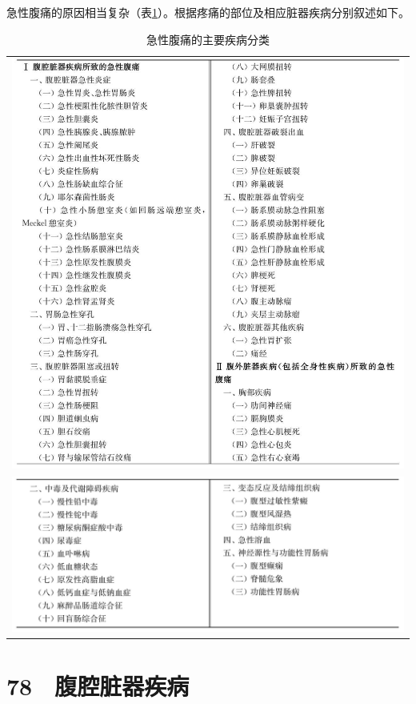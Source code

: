 急性腹痛的原因相当复杂（表\ref{tab25-2}）。根据疼痛的部位及相应脏器疾病分别叙述如下。

\begin{longtable}{c}
 \caption{急性腹痛的主要疾病分类}
 \label{tab25-2}
 \endfirsthead
 \caption[]{急性腹痛的主要疾病分类}
 \endhead
 \includegraphics[width=\textwidth,height=\textheight,keepaspectratio]{./images/Image00141.jpg}\\
 \includegraphics[width=\textwidth,height=\textheight,keepaspectratio]{./images/Image00142.jpg}
 \end{longtable}

\protect\hypertarget{text00194.html}{}{}

\section{78　腹腔脏器疾病}

